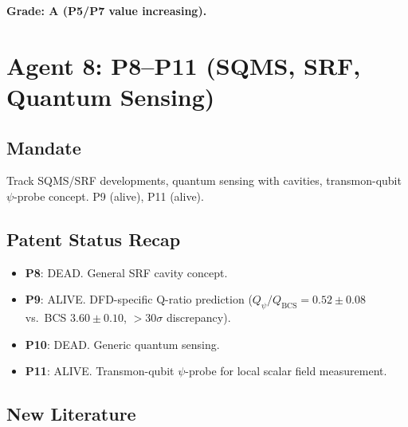 \documentclass[11pt,a4paper]{article}
\begin{document}
\textbf{Grade: A (P5/P7 value increasing).}

\section{Agent 8: P8--P11 (SQMS, SRF, Quantum Sensing)}

\subsection{Mandate}
Track SQMS/SRF developments, quantum sensing with cavities, transmon-qubit $\psi$-probe concept. P9 (alive), P11 (alive).

\subsection{Patent Status Recap}
\begin{itemize}
\item \textbf{P8}: DEAD. General SRF cavity concept.
\item \textbf{P9}: ALIVE. DFD-specific Q-ratio prediction ($Q_\psi / Q_\mathrm{BCS} = 0.52 \pm 0.08$ vs.\ BCS $3.60 \pm 0.10$, $>$30$\sigma$ discrepancy).
\item \textbf{P10}: DEAD. Generic quantum sensing.
\item \textbf{P11}: ALIVE. Transmon-qubit $\psi$-probe for local scalar field measurement.
\end{itemize}

\subsection{New Literature}
\end{document}
